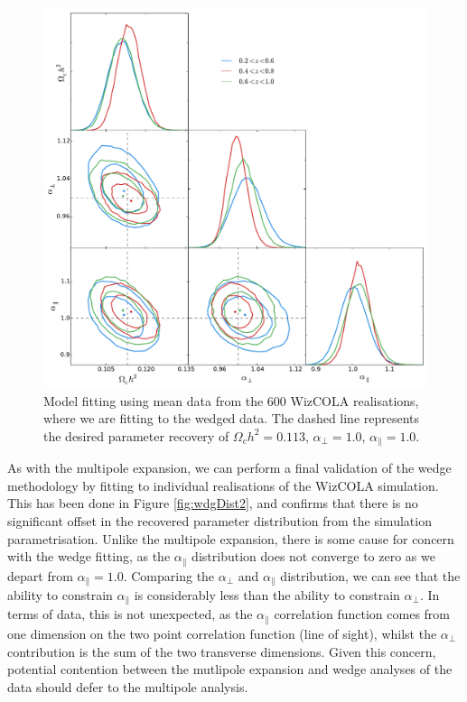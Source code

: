 \documentclass[titlesmallcaps, examinerscopy, copyrightpage]{uqthesis}
\begin{document}
\begin{figure}[h!]
  \begin{center}
    \includegraphics[width=\textwidth]{images/wizwedge.pdf}
  \end{center}
  \caption{Model fitting using mean data from the 600 WizCOLA realisations, where we are fitting to the wedged data. The dashed line represents the desired parameter recovery of $\Omega_c h^2 = 0.113$, $\alpha_\perp=1.0$, $\alpha_\parallel=1.0$. }
  \label{fig:wizwedge}
\end{figure}






As with the multipole expansion, we can perform a final validation of the wedge methodology by fitting to individual realisations of the WizCOLA simulation. This has been done in Figure \ref{fig:wdgDist2}, and confirms that there is no significant offset in the recovered parameter distribution from the simulation parametrisation. Unlike the multipole expansion, there is some cause for concern with the wedge fitting, as the $\alpha_\parallel$ distribution does not converge to zero as we depart from $\alpha_\parallel = 1.0$. Comparing the $\alpha_\perp$ and $\alpha_\parallel$ distribution, we can see that the ability to constrain $\alpha_\parallel$ is considerably less than the ability to constrain $\alpha_\perp$. In terms of data, this is not unexpected, as the $\alpha_\parallel$ correlation function comes from one dimension on the two point correlation function (line of sight), whilst the $\alpha_\perp$ contribution is the sum of the two transverse dimensions. Given this concern, potential contention between the mutlipole expansion and wedge analyses of the data should defer to the multipole analysis.
\end{document}

